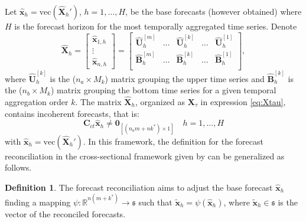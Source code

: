 \documentclass[a4paper,11pt]{article}
\newcommand{\xvet}{\bm{x}}
\newcommand{\Bvet}{\bm{B}}
\newcommand{\Cvet}{\bm{C}}
\newcommand{\Uvet}{\bm{U}}
\newcommand{\Xvet}{\bm{X}}
\newcommand{\Zerovet}{\bm{0}}
\theoremstyle{definition}
\newtheorem{definition}{Definition}[section]
\begin{document}
Let $\widehat{\xvet}_{h} = \mathrm{vec}(\widehat{\Xvet}_{h}')$, $h = 1, \dots, H$, be the base forecasts (however obtained) where $H$ is the forecast horizon for the most temporally aggregated time series. Denote
$$
	\widehat{\Xvet}_{h} = \begin{bmatrix}
		\widehat{\xvet}_{1,h} \\
		\vdots                \\
		\widehat{\xvet}_{n,h}
	\end{bmatrix} =\begin{bmatrix}
		\widehat{\Uvet}_{h}^{[m]} & \dots & \widehat{\Uvet}_{h}^{[k]} & \dots & \widehat{\Uvet}_{h}^{[1]} \\[0.25cm]
		\widehat{\Bvet}_{h}^{[m]} & \dots & \widehat{\Bvet}_{h}^{[k]} & \dots & \widehat{\Bvet}_{h}^{[1]} \\\end{bmatrix},
$$
where $\widehat{\Uvet}_{h}^{[k]}$ is the ($n_a\times M_k$) matrix grouping the upper time series and $\widehat{\Bvet}_{h}^{[k]}$ is the ($n_b\times M_k$) matrix grouping the bottom time series for a given temporal aggregation order $k$. The matrix $\widehat{\Xvet}_{h}$, organized as ${\Xvet}_{\tau}$ in expression \eqref{eq:Xtau}, contains incoherent forecasts, that is:
$$
	\Cvet_{ct} \widehat{\xvet}_{h} \neq \Zerovet_{[(n_am+nk^\ast)\times1]} \quad h = 1, \dots, H
$$
with $\widehat{\xvet}_{h} = \mathrm{vec}(\widehat{\Xvet}_{h}')$. In this framework, the definition for the forecast reconciliation in the cross-sectional framework given by \cite{panagiotelis2021} can be generalized as follows.
\begin{definition}
	The forecast reconciliation aims to adjust the base forecast $\widehat{\xvet}_{h}$ finding a mapping $\psi: \mathbb{R}^{n(m+k^\ast)} \rightarrow \mathfrak{s}$ such that $\widetilde{\xvet}_{h} = \psi\left(\widehat{\xvet}_{h}\right)$, where $\widetilde{\xvet}_{h} \in \mathfrak{s}$ is the vector of the reconciled forecasts.
\end{definition}
\end{document}

